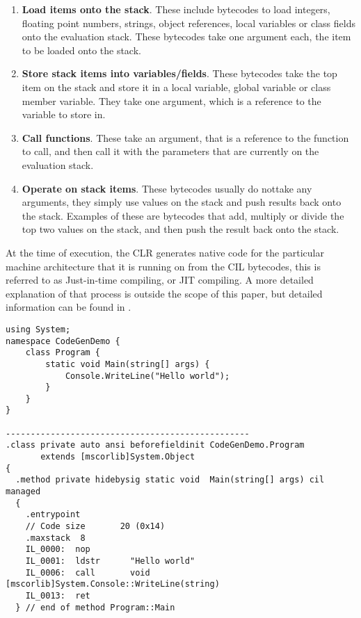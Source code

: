 	\begin{enumerate}
		\item \textbf{Load items onto the stack}. These include bytecodes to load
		integers, floating point numbers, strings, object references, local 
		variables or class fields onto the evaluation stack. These bytecodes take 
		one argument each, the item to be loaded onto the stack.
		
		\item \textbf{Store stack items into variables/fields}. These bytecodes 
		take the top item on the stack and store it in a local variable, global 
		variable or class member variable. They take one argument, which is a 
		reference to the variable to store in.
		
		\item \textbf{Call functions}. These take an argument, that is a reference 
		to the function to call, and then call it with the parameters that are 
		currently on the evaluation stack.
			
		\item \textbf{Operate on stack items}. These bytecodes usually do nottake 
		any arguments, they simply use values on the stack and push results back 
		onto the stack. Examples of these are bytecodes that add, multiply or 
		divide the top two values on the stack, and then push the result back onto 
		the stack.
		
	\end{enumerate}
	
	At the time of execution, the CLR generates native code for the particular 
	machine architecture that it is running on from the CIL bytecodes, this is 
	referred to as Just-in-time compiling, or JIT compiling. A more detailed 
	explanation of that process is outside the scope of this paper, but detailed
	information can be found in .
	
\lstset{language=CSharp}
\lstset{commentstyle=\textit}
\begin{lstlisting}[frame=trbl]
using System;
namespace CodeGenDemo {
    class Program {
        static void Main(string[] args) {
            Console.WriteLine("Hello world");
        }
    }
}

-------------------------------------------------
.class private auto ansi beforefieldinit CodeGenDemo.Program
       extends [mscorlib]System.Object
{
  .method private hidebysig static void  Main(string[] args) cil managed
  {
    .entrypoint
    // Code size       20 (0x14)
    .maxstack  8
    IL_0000:  nop
    IL_0001:  ldstr      "Hello world"
    IL_0006:  call       void [mscorlib]System.Console::WriteLine(string)
    IL_0013:  ret
  } // end of method Program::Main
\end{lstlisting}
  
